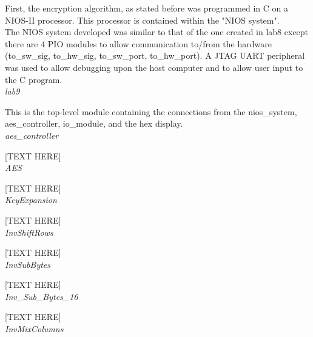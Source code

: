 \documentclass[journal, twocolumn, final,11pt,letterpaper]{IEEEtran}
\begin{document}
First, the encryption algorithm, as stated before was programmed in C on a NIOS-II processor. This processor is contained within the "NIOS system". \\

The NIOS system developed was similar to that of the one created in lab8 except there are 4 PIO modules to allow communication to/from the hardware (to\_sw\_sig, to\_hw\_sig, to\_sw\_port, to\_hw\_port). A JTAG UART peripheral was used to allow debugging upon the host computer and to allow user input to the C program. \\

\textit{lab9}\\
\vspace{-4mm}

This is the top-level module containing the connections from the nios\_system, aes\_controller, io\_module, and the hex display. \\

\textit{aes\_controller}\\
\vspace{-4mm}

[TEXT HERE]\\

\textit{AES}\\
\vspace{-4mm}

[TEXT HERE]\\

\textit{KeyExpansion}\\
\vspace{-4mm}

[TEXT HERE]\\

\textit{InvShiftRows}\\
\vspace{-4mm}

[TEXT HERE]\\

\textit{InvSubBytes}\\
\vspace{-4mm}

[TEXT HERE]\\

\textit{Inv\_Sub\_Bytes\_16}\\
\vspace{-4mm}

[TEXT HERE]\\

\textit{InvMixColumns}\\
\vspace{-4mm}
\end{document}
